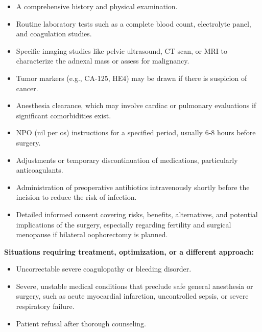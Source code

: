 \begin{itemize}
  \item A comprehensive history and physical examination.
  \item Routine laboratory tests such as a complete blood count, electrolyte panel, and coagulation studies.
  \item Specific imaging studies like pelvic ultrasound, CT scan, or MRI to characterize the adnexal mass or assess for malignancy.
  \item Tumor markers (e.g., CA-125, HE4) may be drawn if there is suspicion of cancer.
  \item Anesthesia clearance, which may involve cardiac or pulmonary evaluations if significant comorbidities exist.
  \item NPO (nil per os) instructions for a specified period, usually 6-8 hours before surgery.
  \item Adjustments or temporary discontinuation of medications, particularly anticoagulants.
  \item Administration of preoperative antibiotics intravenously shortly before the incision to reduce the risk of infection.
  \item Detailed informed consent covering risks, benefits, alternatives, and potential implications of the surgery, especially regarding fertility and surgical menopause if bilateral oophorectomy is planned.
\end{itemize}

\textbf{Situations requiring treatment, optimization, or a different approach:}
\begin{itemize}
  \item Uncorrectable severe coagulopathy or bleeding disorder.
  \item Severe, unstable medical conditions that preclude safe general anesthesia or surgery, such as acute myocardial infarction, uncontrolled sepsis, or severe respiratory failure.
  \item Patient refusal after thorough counseling.
\end{itemize}

